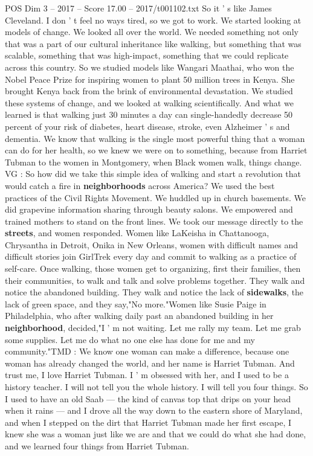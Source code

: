 \begin{textsample}{POS Dim 3 – 2017 – Score 17.00 – 2017/t001102.txt}
So it ' s like James Cleveland.
I don ' t feel no ways tired, so we got to work.
We started looking at models of change.
We looked all over the world.
We needed something not only that was a part of our cultural inheritance like walking, but something that was scalable, something that was high-impact, something that we could replicate across this country.
So we studied models like Wangari Maathai, who won the Nobel Peace Prize for inspiring women to plant 50 million trees in Kenya.
She brought Kenya back from the brink of environmental devastation.
We studied these systems of change, and we looked at walking scientifically.
And what we learned is that walking just 30 minutes a day can single-handedly decrease 50 percent of your risk of diabetes, heart disease, stroke, even Alzheimer ' s and dementia.
We know that walking is the single most powerful thing that a woman can do for her health, so we knew we were on to something, because from Harriet Tubman to the women in Montgomery, when Black women walk, things change.
VG : So how did we take this simple idea of walking and start a revolution that would catch a fire in \textbf{neighborhoods} across America?
We used the best practices of the Civil Rights Movement.
We huddled up in church basements.
We did grapevine information sharing through beauty salons.
We empowered and trained mothers to stand on the front lines.
We took our message directly to the \textbf{streets}, and women responded.
Women like LaKeisha in Chattanooga, Chrysantha in Detroit, Onika in New Orleans, women with difficult names and difficult stories join GirlTrek every day and commit to walking as a practice of self-care.
Once walking, those women get to organizing, first their families, then their communities, to walk and talk and solve problems together.
They walk and notice the abandoned building.
They walk and notice the lack of \textbf{sidewalks}, the lack of green space, and they say,"No more."Women like Susie Paige in Philadelphia, who after walking daily past an abandoned building in her \textbf{neighborhood}, decided,"I ' m not waiting.
Let me rally my team.
Let me grab some supplies.
Let me do what no one else has done for me and my community."TMD : We know one woman can make a difference, because one woman has already changed the world, and her name is Harriet Tubman.
And trust me, I love Harriet Tubman.
I ' m obsessed with her, and I used to be a history teacher.
I will not tell you the whole history.
I will tell you four things.
So I used to have an old Saab — the kind of canvas top that drips on your head when it rains — and I drove all the way down to the eastern shore of Maryland, and when I stepped on the dirt that Harriet Tubman made her first escape, I knew she was a woman just like we are and that we could do what she had done, and we learned four things from Harriet Tubman.

\end{textsample}
